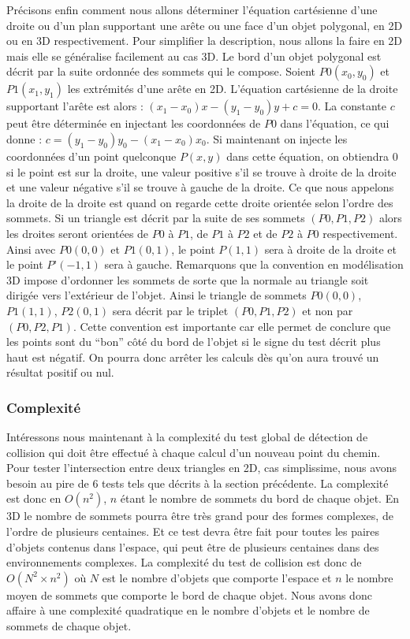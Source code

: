 \documentclass{article}
\begin{document}
Précisons enfin comment nous allons déterminer l’équation cartésienne d’une droite ou d’un plan supportant une arête ou une face d’un objet polygonal, en 2D ou en 3D respectivement. Pour simplifier la description, nous allons la faire en 2D mais elle se généralise facilement au cas 3D. Le bord d’un objet polygonal est décrit par la suite ordonnée des sommets qui le compose. Soient $P0(x_0,y_0)$ et $P1(x_1,y_1)$ les extrémités d’une arête en 2D. L’équation cartésienne de la droite supportant l’arête est alors : $(x_1-x_0)x - (y_1-y_0)y + c = 0$. La constante $c$ peut être déterminée en injectant les coordonnées de $P0$ dans l’équation, ce qui donne : $c = (y_1-y_0)y_0 - (x_1-x_0)x_0$. Si maintenant on injecte les coordonnées d’un point quelconque $P(x,y)$ dans cette équation, on obtiendra $0$ si le point est sur la droite, une valeur positive s’il se trouve à droite de la droite et une valeur négative s’il se trouve à gauche de la droite. Ce que nous appelons la droite de la droite est quand on regarde cette droite orientée selon l’ordre des sommets. Si un triangle est décrit par la suite de ses sommets $(P0,P1,P2)$ alors les droites seront orientées de $P0$ à $P1$, de $P1$ à $P2$ et de $P2$ à $P0$ respectivement. Ainsi avec $P0(0,0)$ et $P1(0,1)$, le point $P(1,1)$ sera à droite de la droite et le point $P’(-1,1)$ sera à gauche. Remarquons que la convention en modélisation 3D impose d’ordonner les sommets de sorte que la normale au triangle soit dirigée vers l’extérieur de l’objet. Ainsi le triangle de sommets $P0(0,0)$, $P1(1,1)$, $P2(0,1)$ sera décrit par le triplet $(P0,P1,P2)$ et non par $(P0,P2,P1)$. Cette convention est importante car elle permet de conclure que les points sont du “bon” côté du bord de l’objet si le signe du test décrit plus haut est négatif. On pourra donc arrêter les calculs dès qu’on aura trouvé un résultat positif ou nul.

\subsubsection{Complexité}
Intéressons nous maintenant à la complexité du test global de détection de collision qui doit être effectué à chaque calcul d’un nouveau point du chemin. Pour tester l’intersection entre deux triangles en 2D, cas simplissime, nous avons besoin au pire de 6 tests tels que décrits à la section précédente. La complexité est donc en $O(n^2)$, $n$ étant le nombre de sommets du bord de chaque objet. En 3D le nombre de sommets pourra être très grand pour des formes complexes, de l’ordre de plusieurs centaines. Et ce test devra être fait pour toutes les paires d’objets contenus dans l’espace, qui peut être de plusieurs centaines dans des environnements complexes. La complexité du test de collision est donc de $O(N^2 \times n^2)$ où $N$ est le nombre d’objets que comporte l’espace et $n$ le nombre moyen de sommets que comporte le bord de chaque objet. Nous avons donc affaire à une complexité quadratique en le nombre d’objets et le nombre de sommets de chaque objet.
\end{document}
